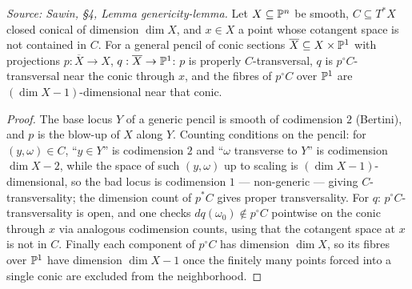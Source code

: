 \begin{lemma}
  \label{lem:sawin_genericity}
  \textit{Source: Sawin, §4, Lemma genericity-lemma.}
  Let $X\subseteq\mathbb{P}^n$ be smooth, $C\subseteq T^*X$ closed conical of dimension
  $\dim X$, and $x\in X$ a point whose cotangent space is not contained in $C$.
  For a general pencil of conic sections $\overline X\subseteq X\times\mathbb{P}^1$ with
  projections $p:\overline X\to X$, $q:\overline X\to\mathbb{P}^1$: $p$ is properly
  $C$-transversal, $q$ is $p^\circ C$-transversal near the conic through $x$, and
  the fibres of $p^\circ C$ over $\mathbb{P}^1$ are $(\dim X-1)$-dimensional near that
  conic.
\end{lemma}
\begin{proof}
  The base locus $Y$ of a generic pencil is smooth of codimension $2$ (Bertini),
  and $p$ is the blow-up of $X$ along $Y$.  Counting conditions on the pencil:
  for $(y,\omega)\in C$, ``$y\in Y$'' is codimension $2$ and ``$\omega$ transverse
  to $Y$'' is codimension $\dim X-2$, while the space of such $(y,\omega)$ up to
  scaling is $(\dim X-1)$-dimensional, so the bad locus is codimension $1$ ---
  non-generic --- giving $C$-transversality; the dimension count of $p^*C$ gives
  proper transversality.  For $q$: $p^\circ C$-transversality is open, and one
  checks $dq(\omega_0)\notin p^\circ C$ pointwise on the conic through $x$ via
  analogous codimension counts, using that the cotangent space at $x$ is not in
  $C$.  Finally each component of $p^\circ C$ has dimension $\dim X$, so its
  fibres over $\mathbb{P}^1$ have dimension $\dim X-1$ once the finitely many points
  forced into a single conic are excluded from the neighborhood.
\end{proof}


